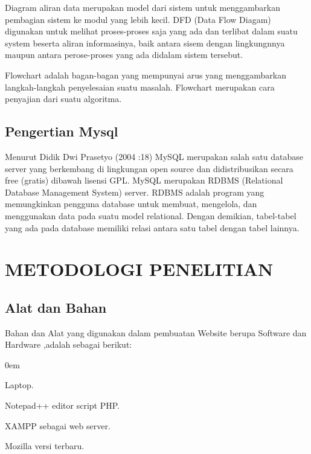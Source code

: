 \documentclass{jtetiproposalskripsi}
\begin{document}
Diagram aliran data merupakan model dari sistem untuk menggambarkan pembagian sistem ke modul yang lebih kecil. DFD (Data Flow Diagam) digunakan untuk melihat proses-proses saja yang ada dan terlibat dalam suatu system beserta aliran informasinya, baik antara sisem dengan lingkungnnya maupun antara perose-proses yang ada didalam sistem tersebut.

Flowchart adalah bagan-bagan yang mempunyai arus yang menggambarkan langkah-langkah penyelesaian suatu masalah. Flowchart merupakan cara penyajian dari suatu algoritma.

\section{Pengertian Mysql}
Menurut Didik Dwi Prasetyo (2004 :18) MySQL merupakan salah satu 
database server yang berkembang di lingkungan open source dan didistribusikan secara free (gratis) dibawah lisensi GPL. MySQL merupakan RDBMS (Relational Database Management System) server. RDBMS adalah program yang memungkinkan pengguna database untuk membuat, mengelola, dan menggunakan data pada suatu model relational. 
Dengan demikian, tabel-tabel yang ada pada database memiliki relasi antara satu 
tabel dengan tabel lainnya.

\chapter{METODOLOGI PENELITIAN}

\section{Alat dan Bahan}
Bahan dan Alat yang digunakan dalam pembuatan Website berupa Software dan Hardware ,adalah sebagai berikut:

\vspace{-0.5cm}

\begin{enumerate}[a.]
\begin{singlespace}
\itemsep0em
\item Laptop.
\item Notepad++ editor script PHP.
\item XAMPP sebagai web server.
\item Mozilla versi terbaru.

\end{singlespace}
\end{enumerate}
\end{document}
